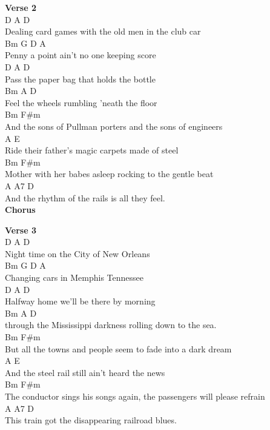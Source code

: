 \documentclass[a4paper]{article}
\begin{document}
{{        }
        \textbf{Verse 2}
        ~\\
        {
            \cutive
            \obeyspaces
        D                   A              D
\\
Dealing card games with the old men in the club car
\\
Bm                  G              D    A
\\
Penny a point ain't no one keeping score
\\
D                       A         D
\\
Pass the paper bag that holds the bottle
\\
Bm              A                   D
\\
Feel the wheels rumbling 'neath the floor
\\
        Bm                              F\#m
\\
And the sons of Pullman porters and the sons of engineers
\\
A                                         E
\\
Ride their father's magic carpets made of steel
\\
Bm                           F\#m
\\
Mother with her babes asleep rocking to the gentle beat
\\
        A             A7                D
\\
And the rhythm of the rails is all they feel.
\\

        }
        \textbf{Chorus}
        ~\\
        {
            \cutive
            \obeyspaces

        }
        \textbf{Verse 3}
        ~\\
        {
            \cutive
            \obeyspaces
D                 A       D   
\\
Night time on the City of New Orleans
\\
Bm               G             D   A
\\
Changing cars in Memphis Tennessee
\\
D            A                 D   
\\
Halfway home we'll be there by morning
\\
            Bm                   A                   D  
\\
through the Mississippi darkness rolling down to the sea.
\\
    Bm                               F\#m
\\
But all the towns and people seem to fade into a dark dream
\\
        A                                E
\\
And the steel rail still ain't heard the news
\\
    Bm                                   F\#m
\\
The conductor sings his songs again, the passengers will please refrain
\\
     A                  A7               D
\\
This train got the disappearing railroad blues. 
\\

}}
\end{document}
